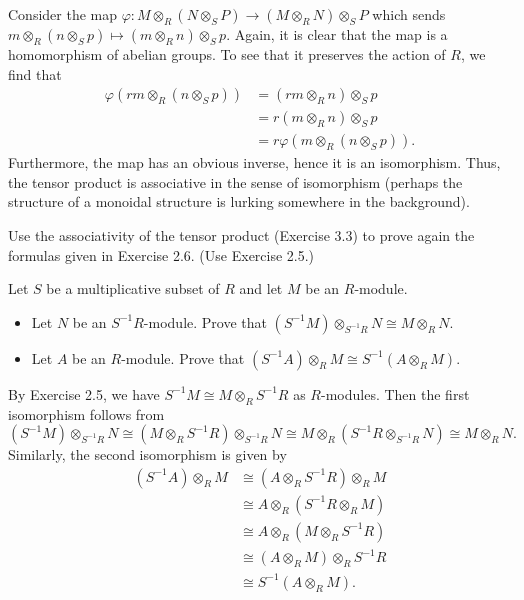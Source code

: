 \documentclass[../../master.tex]{subfiles}
\begin{document}
\begin{solution}
    Consider the map $\varphi : M \otimes_R (N \otimes_S P) \to (M \otimes_R N) \otimes_S P$ which sends $m \otimes_R (n \otimes_S p) \mapsto (m \otimes_R n) \otimes_S p$.
    Again, it is clear that the map is a homomorphism of abelian groups.
    To see that it preserves the action of $R$, we find that
    \begin{align*}
        \varphi(rm \otimes_R (n \otimes_S p)) &= (rm \otimes_R n) \otimes_S p \\
                                              &= r(m \otimes_R n) \otimes_S p \\
                                              &= r\varphi(m \otimes_R (n \otimes_S p)).
    \end{align*}
    Furthermore, the map has an obvious inverse, hence it is an isomorphism.
    Thus, the tensor product is associative in the sense of isomorphism (perhaps the structure of a monoidal structure is lurking somewhere in the background).
\end{solution}

\begin{problem}
    Use the associativity of the tensor product (Exercise 3.3) to prove again the formulas given in Exercise 2.6.
    (Use Exercise 2.5.)

    Let $S$ be a multiplicative subset of $R$ and let $M$ be an $R$-module.
    \begin{itemize}
    \item Let $N$ be an $S^{-1}R$-module.
        Prove that $(S^{-1}M) \otimes_{S^{-1}R} N \cong M \otimes_R N$.
    \item Let $A$ be an $R$-module.
        Prove that $(S^{-1}A) \otimes_R M \cong S^{-1}(A \otimes_R M)$.
    \end{itemize}
\end{problem}

\begin{solution}
    By Exercise 2.5, we have $S^{-1}M \cong M \otimes_R S^{-1}R$ as $R$-modules.
    Then the first isomorphism follows from
    \[
        (S^{-1}M) \otimes_{S^{-1}R} N \cong (M \otimes_R S^{-1}R) \otimes_{S^{-1}R} N \cong M \otimes_R (S^{-1}R \otimes_{S^{-1}R} N) \cong M \otimes_R N.
    \]
    Similarly, the second isomorphism is given by
    \begin{align*}
        (S^{-1}A) \otimes_R M &\cong (A \otimes_R S^{-1}R) \otimes_R M \\
                              &\cong A \otimes_R (S^{-1}R \otimes_R M) \\
                              &\cong A \otimes_R (M \otimes_R S^{-1}R) \\
                              &\cong (A \otimes_R M) \otimes_R S^{-1}R \\
                              &\cong S^{-1}(A \otimes_R M).
    \end{align*}
\end{solution}
\end{document}
